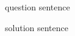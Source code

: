 \begin{questions}
	\question question sentence
	\begin{solution}
		solution sentence
	\end{solution}
\end{questions}
